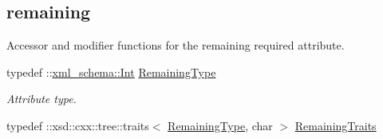 \subsection*{remaining}
\label{_amgrp2626772c17d90cf46be4fe981ff30ac8}
Accessor and modifier functions for the remaining required attribute. \begin{DoxyCompactItemize}
\item 
\hypertarget{classopenstack_1_1xml_1_1RateLimit_a13144403e8af4dadd7e149adc68ff5d1}{
typedef ::\hyperlink{namespacexml__schema_a12d975a13061c938969b2b5143e97645}{xml\_\-schema::Int} \hyperlink{classopenstack_1_1xml_1_1RateLimit_a13144403e8af4dadd7e149adc68ff5d1}{RemainingType}}
\label{classopenstack_1_1xml_1_1RateLimit_a13144403e8af4dadd7e149adc68ff5d1}

\begin{DoxyCompactList}\small\item\em Attribute type. \item\end{DoxyCompactList}\item 
\hypertarget{classopenstack_1_1xml_1_1RateLimit_a374815727e564a4367d0771e96e85e74}{
typedef ::xsd::cxx::tree::traits$<$ \hyperlink{classopenstack_1_1xml_1_1RateLimit_a13144403e8af4dadd7e149adc68ff5d1}{RemainingType}, char $>$ \hyperlink{classopenstack_1_1xml_1_1RateLimit_a374815727e564a4367d0771e96e85e74}{RemainingTraits}}
\label{classopenstack_1_1xml_1_1RateLimit_a374815727e564a4367d0771e96e85e74}


\end{DoxyCompactItemize}

